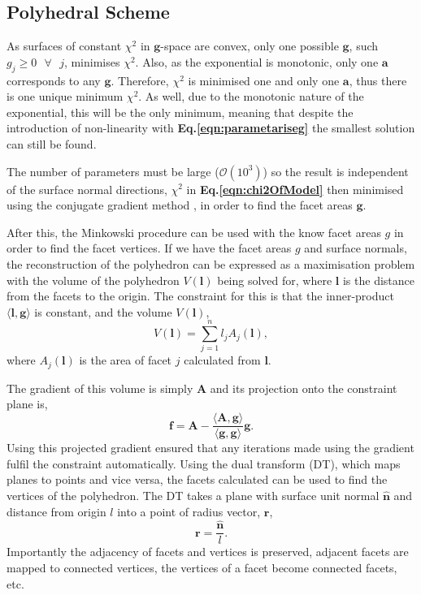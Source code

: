 \documentclass[10pt,twocolumn]{revtex4}    %
\newcommand{\refeq}[1]{\textbf{Eq.#1}}
\newcommand{\xsqrd}{\chi^2}
\begin{document}
\subsection{Polyhedral Scheme}\label{ssec:polyhedraScheme}

As surfaces of constant $\xsqrd$ in $\textbf{g}$-space are convex, only one possible $\textbf{g}$, such $g_j \ge 0 \text{ } \forall \text{ } j$, minimises
$\xsqrd$. Also, as the exponential is monotonic, only one $\textbf{a}$ corresponds to any $\textbf{g}$. Therefore, $\xsqrd$ is minimised one and only one $\textbf{a}$, thus there is one unique minimum $\xsqrd$. As well, due to the monotonic nature of the exponential, this will be the only minimum, meaning that despite the introduction of non-linearity with \refeq{\ref{eqn:parametariseg}} the smallest solution can still be found.

The number of parameters must be large ($\mathcal{O}(10^3)$) so the result is independent of the surface normal directions, $\xsqrd$ in \refeq{\ref{eqn:chi2OfModel}} then minimised using the conjugate gradient method \textbf{\cite{conjugateGradMethod}}, in order to find the facet areas $\textbf{g}$.
    
After this, the Minkowski procedure can be used with the know facet areas $g$ in order to find the facet vertices. 
If we have the facet areas $g$ and surface normals, the reconstruction of the polyhedron can be expressed as a maximisation problem with the volume of the polyhedron $V(\textbf{l})$ being solved for, where $\textbf{l}$ is the distance from the facets to the origin. The constraint for this is that the inner-product $\langle \textbf{l},\textbf{g} \rangle$ is constant, and the volume $V(\textbf{l})$,
\begin{equation}
    \label{eqn:polyhedraVol}
    V(\textbf{l}) = \sum\limits_{j=1}^n l_j A_j(\textbf{l}),
\end{equation} where $A_j(\textbf{l})$ is the area of facet $j$ calculated from $\textbf{l}$.

The gradient of this volume is simply $\textbf{A}$ and its projection onto the constraint plane is,
\begin{equation}
    \label{eqn:APOnConstraint}
    \textbf{f} = \textbf{A} - \frac{\langle \textbf{A}, \textbf{g} \rangle}{\langle \textbf{g},\textbf{g} \rangle} \textbf{g}.
\end{equation} Using this projected gradient ensured that any iterations made using the gradient fulfil the constraint automatically. 
Using the dual transform (DT), which maps planes to points and vice versa, the facets calculated can be used to find the vertices of the polyhedron. The DT takes a plane with surface unit normal $\hat{\textbf{n}}$ and distance from origin $l$ into a point of radius vector, $\textbf{r}$,
\begin{equation}
    \label{eqn:radiusVector}
    \textbf{r} = \frac{\hat{\textbf{n}}}{l}.
\end{equation}
Importantly the adjacency of facets and vertices is preserved, adjacent facets are mapped to connected vertices, the vertices of a facet become connected facets, etc.
\end{document}

